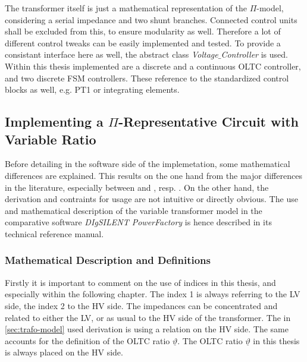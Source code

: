 The transformer itself is just a mathematical representation of the $\Pi$-model, considering a serial impedance and two shunt branches.
Connected control units shall be excluded from this, to ensure modularity as well. 
Therefore a lot of different control tweaks can be easily implemented and tested.
To provide a consistant interface here as well, the abstract class \textit{Voltage$\_$Controller} is used.
Within this thesis implemented are a discrete and a continuous \acs{OLTC} controller, and two discrete \acs{FSM} controllers.
These reference to the standardized control blocks as well, e.g. PT1 or integrating elements.

\subsection{Implementing a \texorpdfstring{$\Pi{}$}{}-Representative Circuit with Variable Ratio}

Before detailing in the software side of the implemetation, some mathematical differences are explained.
This results on the one hand from the major differences in the literature, especially between \textcite{machowski_2020} and \textcite{kundur_2022}, resp. \textcite{milano_2010}.
On the other hand, the derivation and contraints for usage are not intuitive or directly obvious.
The use and mathematical description of the variable transformer model in the comparative software \textit{DIgSILENT PowerFactory} is hence described in its technical reference manual. 

\subsubsection{Mathematical Description and Definitions}

Firstly it is important to comment on the use of indices in this thesis, and especially within the following chapter.
The index 1 is always referring to the \acs{LV} side, the index 2 to the \acs{HV} side. 
The impedances can be concentrated and related to either the \acs{LV}, or as usual to the \acs{HV} side of the transformer. 
The in \autoref{sec:trafo-model} used derivation is using a relation on the \acs{HV} side.
The same accounts for the definition of the \acs{OLTC} ratio $\underline{\vartheta}$.     
The \acs{OLTC} ratio $\underline{\vartheta}$ in this thesis is always placed on the \acs{HV} side.

